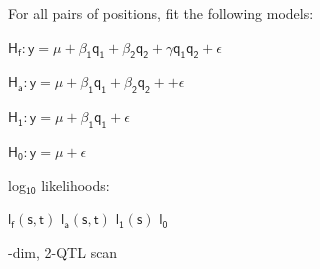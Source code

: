 \documentclass[12pt]{article}
\newcommand{\headsize}{\fontsize{35}{35} \selectfont}
\newcommand{\smallsize}{\fontsize{25}{30} \selectfont}
\begin{document}
\color{mywhite} \smallsize

\hfill \begin{minipage}[t]{10in}
For all pairs of positions, fit the following models:

\vspace{10mm}

\hfill
\begin{minipage}{9in}
{\color{myblue}
$\mathsf{\text{H}_f: y = \mu + \beta_1 q_1 + \beta_2 q_2 +
      \gamma q_1 q_2 + \epsilon}$

\vspace{5mm}

$\mathsf{\text{H}_a: y = \mu + \beta_1 q_1 + \beta_2 q_2 +
      + \epsilon}$

\vspace{5mm}

$\mathsf{\text{H}_1: y = \mu + \beta_1 q_1 + \epsilon}$

\vspace{5mm}

$\mathsf{\text{H}_0: y = \mu + \epsilon}$

}
\end{minipage}

\vspace{20mm}

log$_{\mathsf{10}}$ likelihoods:

\vspace{5mm}

\hfill
\begin{minipage}{9in}
{\color{myblue}

$\mathsf{l_f(s,t)}$ \hspace{2cm}
$\mathsf{l_a(s,t)}$ \hspace{2cm}
$\mathsf{l_1(s)}$ \hspace{2cm}
$\mathsf{l_0}$ \hspace{2cm}
}
\end{minipage}


\end{minipage}


\newpage

\headsize \color{myyellow}
\hfill \begin{minipage}{5.75in}
-dim, 2-QTL scan
\end{minipage}

\vspace{2cm}

\color{mywhite} \smallsize
\end{document}
